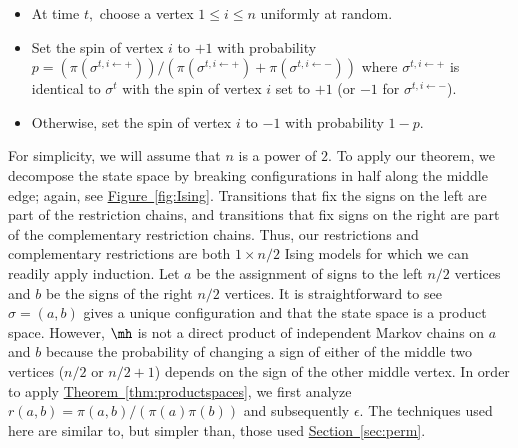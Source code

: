\documentclass[11pt]{article}
\providecommand{\expref}[2]{\texorpdfstring{\hyperref[#2]{#1~\ref{#2}}}{#1~\ref{#2}}}
\begin{document}
\vspace{.05in}
\begin{itemize}
\item At time $t,$ choose a vertex $1\leq i \leq n$ uniformly at random.  
\item Set the spin of vertex $i$ to $+1$ with probability $p = (\pi(\sigma^{t, i \leftarrow +}))/(\pi(\sigma^{t, i \leftarrow +})+ \pi(\sigma^{t, i \leftarrow -}))$ where $\sigma^{t, i \leftarrow +}$ is identical to $\sigma^t$ with the spin of vertex $i$ set to $+1$ (or $-1$ for $\sigma^{t, i \leftarrow -}$).
\item Otherwise, set the spin of vertex $i$ to $-1$ with probability $1-p.$
\end{itemize}

\noindent For simplicity, we will assume that $n$ is a power of $2$. To 
apply our theorem, we decompose the state space by breaking 
configurations in half along the middle edge; again, see 
\expref{Figure}{fig:Ising}.  Transitions that fix the signs on the left are 
part of the restriction chains, and transitions that fix signs on the 
right are part of the complementary restriction chains.  Thus, our 
restrictions and complementary restrictions are both $1 \times n/2$ 
Ising models for which we can readily apply induction.  Let $a$ be the 
assignment of signs to the left $n/2$ vertices and $b$ be the signs of 
the right $n/2$ vertices.  It is straightforward to see $\sigma = 
(a,b)$ gives a unique configuration and that the state space is a 
product space.  However, $\mh$ is not a direct product of independent 
Markov chains on $a$ and $b$ because the probability of changing a sign 
of either of the middle two vertices ($n/2$ or $n/2+1$) depends on the 
sign of the other middle vertex. In order to apply 
\expref{Theorem}{thm:productspaces}, we first analyze $r(a,b) = \pi(a,b)/ 
(\pi(a)\pi(b))$ and subsequently $\epsilon$.  The techniques used here 
are similar to, but simpler than, those used \expref{Section}{sec:perm}. 
\end{document}
